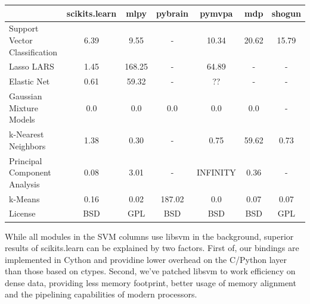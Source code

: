 \documentclass[twoside,11pt]{article}
\begin{document}
\begin{center}


\begin{tabular}{l c c c c c c}
\hline\hline %
 & scikits.learn & mlpy & pybrain & pymvpa &  mdp & shogun \\ [0.5ex]
\hline
Support Vector Classification & 6.39 & 9.55 & - & 10.34 & 20.62 & 15.79 \\
Lasso LARS & 1.45 & 168.25   & -       &  64.89     & -    & - \\
Elastic Net & 0.61 & 59.32 & -  &  ??  & -  & - \\
Gaussian Mixture Models  & 0.0 & 0.0   & 0.0       &  0.0     & 0.0    & - \\
k-Nearest Neighbors & 1.38 & 0.30  & - &  0.75 & 59.62    & 0.73 \\
Principal Component Analysis & 0.08 & 3.01  & -  & INFINITY  & 0.36  & - \\
k-Means  & 0.16 & 0.02 & 187.02  & 0.0  & 0.07  & 0.07 \\
License &  BSD & GPL & BSD  &  BSD  & BSD  & GPL \\
\hline
\end{tabular}

\end{center}






While all modules in the SVM columns use libsvm \cite{libsvm} in the
background, superior results of scikits.learn can be explained by two
factors. First of, our bindings are implemented in Cython and
providine lower overhead on the C/Python layer than those based on
ctypes. Second, we've patched libsvm to work efficiency on dense data,
providing less memory footprint, better usage of memory alignment and
the pipelining capabilities of modern processors.
\end{document}
